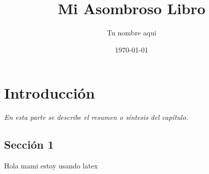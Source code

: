 \documentclass[]{book}
\title{\bf Mi Asombroso Libro}
\author{Tu nombre aqui}
\date{\today}
\begin{document}
\frontmatter
\maketitle
\tableofcontents
\mainmatter
\chapter{Introducción}
\begin{center}
\textit{En esta parte se describe el resumen o síntesis
del capítulo.}
\end{center}
\section{Sección 1}
Hola mami estoy usando latex
\end{document}
